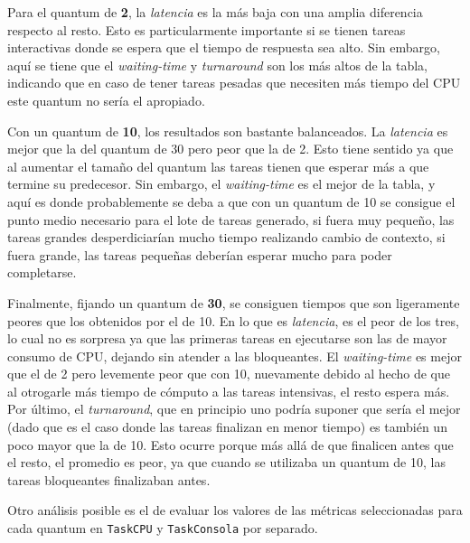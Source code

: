 Para el quantum de \textbf{2}, la \emph{latencia} es la más baja con una amplia
diferencia respecto al resto. Esto es particularmente importante si se tienen
tareas interactivas donde se espera que el tiempo de respuesta sea alto. Sin
embargo, aquí se tiene que el \emph{waiting-time} y \emph{turnaround} son los
más altos de la tabla, indicando que en caso de tener tareas pesadas que
necesiten más tiempo del CPU este quantum no sería el apropiado.

Con un quantum de \textbf{10}, los resultados son bastante balanceados. La
\emph{latencia} es mejor que la del quantum de 30 pero peor que la de 2. Esto
tiene sentido ya que al aumentar el tamaño del quantum las tareas tienen que
esperar más a que termine su predecesor. Sin embargo, el \emph{waiting-time} es
el mejor de la tabla, y aquí es donde probablemente se deba a que con un quantum
de 10 se consigue el punto medio necesario para el lote de tareas generado, si
fuera muy pequeño, las tareas grandes desperdiciarían mucho tiempo
realizando cambio de contexto, si fuera grande, las tareas pequeñas deberían
esperar mucho para poder completarse.

Finalmente, fijando un quantum de \textbf{30}, se consiguen tiempos que son
ligeramente peores que los obtenidos por el de 10. En lo que es \emph{latencia},
es el peor de los tres, lo cual no es sorpresa ya que las primeras tareas en
ejecutarse son las de mayor consumo de CPU, dejando sin atender a las
bloqueantes. El \emph{waiting-time} es mejor que el de 2 pero levemente peor que
con 10, nuevamente debido al hecho de que al otrogarle más tiempo de
cómputo a las tareas intensivas, el resto espera más. Por último, el
\emph{turnaround}, que en principio uno podría suponer que sería el mejor (dado
que es el caso donde las tareas finalizan en menor tiempo) es también un
poco mayor que la de 10. Esto ocurre porque más allá de que finalicen antes que
el resto, el promedio es peor, ya que cuando se utilizaba un quantum de 10, las
tareas bloqueantes finalizaban antes.

Otro análisis posible es el de evaluar los valores de las métricas seleccionadas
para cada quantum en \texttt{TaskCPU} y \texttt{TaskConsola} por separado.

